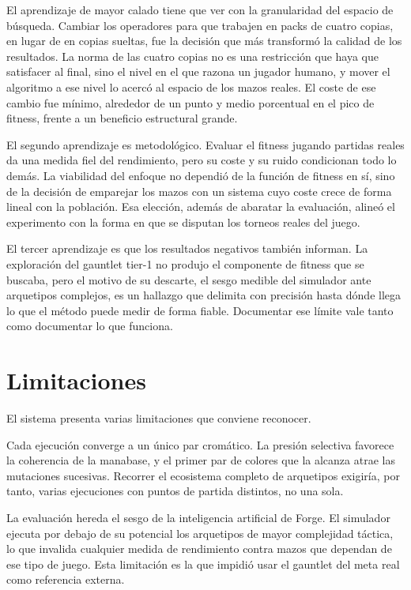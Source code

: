 El aprendizaje de mayor calado tiene que ver con la granularidad del espacio de búsqueda. Cambiar los operadores para que trabajen en packs de cuatro copias, en lugar de en copias sueltas, fue la decisión que más transformó la calidad de los resultados. La norma de las cuatro copias no es una restricción que haya que satisfacer al final, sino el nivel en el que razona un jugador humano, y mover el algoritmo a ese nivel lo acercó al espacio de los mazos reales. El coste de ese cambio fue mínimo, alrededor de un punto y medio porcentual en el pico de fitness, frente a un beneficio estructural grande.

El segundo aprendizaje es metodológico. Evaluar el fitness jugando partidas reales da una medida fiel del rendimiento, pero su coste y su ruido condicionan todo lo demás. La viabilidad del enfoque no dependió de la función de fitness en sí, sino de la decisión de emparejar los mazos con un sistema cuyo coste crece de forma lineal con la población. Esa elección, además de abaratar la evaluación, alineó el experimento con la forma en que se disputan los torneos reales del juego.

El tercer aprendizaje es que los resultados negativos también informan. La exploración del gauntlet tier-1 no produjo el componente de fitness que se buscaba, pero el motivo de su descarte, el sesgo medible del simulador ante arquetipos complejos, es un hallazgo que delimita con precisión hasta dónde llega lo que el método puede medir de forma fiable. Documentar ese límite vale tanto como documentar lo que funciona.

\section{Limitaciones}

El sistema presenta varias limitaciones que conviene reconocer.

Cada ejecución converge a un único par cromático. La presión selectiva favorece la coherencia de la manabase, y el primer par de colores que la alcanza atrae las mutaciones sucesivas. Recorrer el ecosistema completo de arquetipos exigiría, por tanto, varias ejecuciones con puntos de partida distintos, no una sola.

La evaluación hereda el sesgo de la inteligencia artificial de Forge. El simulador ejecuta por debajo de su potencial los arquetipos de mayor complejidad táctica, lo que invalida cualquier medida de rendimiento contra mazos que dependan de ese tipo de juego. Esta limitación es la que impidió usar el gauntlet del meta real como referencia externa.

